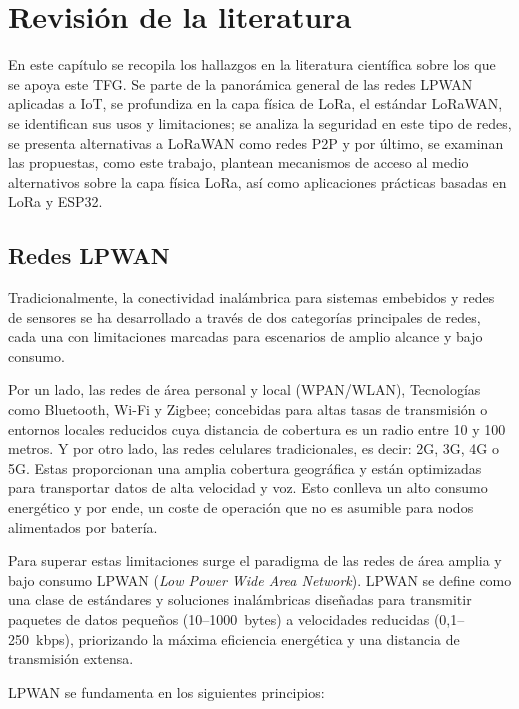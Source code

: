 \chapter{Revisión de la literatura}\label{chap:2}

En este capítulo se recopila los hallazgos en la literatura científica sobre los que se apoya este TFG. Se parte de la panorámica general de las redes LPWAN aplicadas a IoT, se profundiza en la capa física de LoRa, el estándar LoRaWAN, se identifican sus usos y limitaciones; se analiza la seguridad en este tipo de redes, se presenta alternativas a LoRaWAN como redes P2P y por último, se examinan las propuestas, como este trabajo, plantean mecanismos de acceso al medio alternativos sobre la capa física LoRa, así como aplicaciones prácticas basadas en LoRa y ESP32.

\section{Redes LPWAN}

Tradicionalmente, la conectividad inalámbrica para sistemas embebidos y redes de sensores se ha desarrollado a través de dos categorías principales de redes, cada una con limitaciones marcadas para escenarios de amplio alcance y bajo consumo.

Por un lado, las redes de área personal y local (WPAN/WLAN), Tecnologías como Bluetooth, Wi-Fi y Zigbee; concebidas para altas tasas de transmisión o entornos locales reducidos cuya distancia de cobertura es un radio entre 10 y 100 metros. Y por otro lado, las redes celulares tradicionales, es decir: 2G, 3G, 4G o 5G. Estas proporcionan una amplia cobertura geográfica y están optimizadas para transportar datos de alta velocidad y voz. Esto conlleva un alto consumo energético y por ende, un coste de operación que no es asumible para nodos alimentados por batería. 

Para superar estas limitaciones surge el paradigma de las redes de área amplia y bajo consumo LPWAN (\textit{Low Power Wide Area Network}). LPWAN se define como una clase de estándares y soluciones inalámbricas diseñadas para transmitir paquetes de datos pequeños (10--1000~bytes) a velocidades reducidas (0,1--250~kbps), priorizando la máxima eficiencia energética y una distancia de transmisión extensa.

LPWAN se fundamenta en los siguientes principios:

